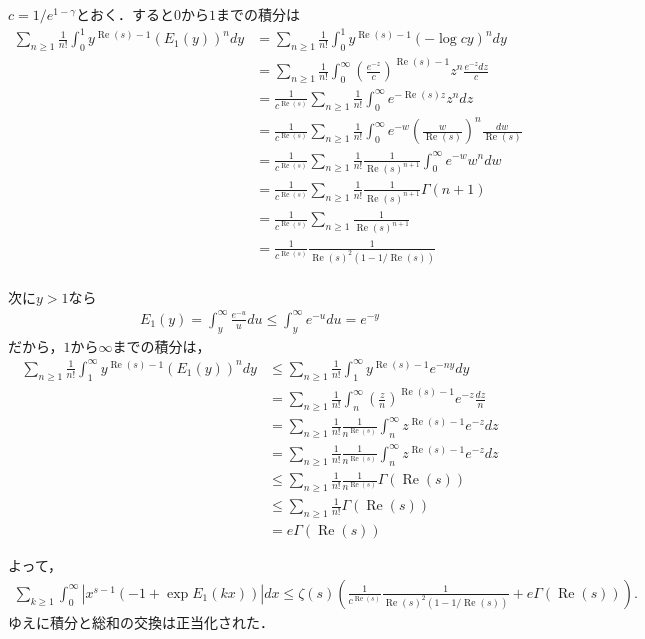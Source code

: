 \documentclass{jsarticle}
\renewcommand\Re{\operatorname{Re}}
\theoremstyle{definition}
\begin{document}
$c = 1/e^{1-\gamma}$とおく．すると$0$から$1$までの積分は
\begin{align*}
\sum_{n \ge 1} \frac{1}{n!} \int_0^1 y^{\Re(s)-1} (E_1(y))^n dy
&= \sum_{n \ge 1} \frac{1}{n!} \int_0^1 y^{\Re(s)-1} (- \log cy)^n dy \\
&= \sum_{n \ge 1} \frac{1}{n!} \int_0^\infty  \left(\frac{e^{-z}}{c}\right)^{\Re(s)-1} z^n \frac{e^{-z}dz}{c} \\
&= \frac{1}{c^{\Re(s)}}\sum_{n \ge 1} \frac{1}{n!} \int_0^\infty  e^{-\Re(s) z} z^n dz \\
&= \frac{1}{c^{\Re(s)}}\sum_{n \ge 1} \frac{1}{n!} \int_0^\infty  e^{-w} \left(\frac{w}{\Re(s)}\right)^n \frac{dw}{\Re(s)} \\
&= \frac{1}{c^{\Re(s)}}\sum_{n \ge 1} \frac{1}{n!} \frac{1}{\Re(s)^{n+1}} \int_0^\infty  e^{-w} w^n dw \\
&= \frac{1}{c^{\Re(s)}}\sum_{n \ge 1} \frac{1}{n!} \frac{1}{\Re(s)^{n+1}} \Gamma(n+1) \\
&= \frac{1}{c^{\Re(s)}}\sum_{n \ge 1} \frac{1}{\Re(s)^{n+1}}  \\
&= \frac{1}{c^{\Re(s)}} \frac{1}{\Re(s)^2 (1-1/\Re(s))}  \\
\end{align*}

次に$y > 1$なら
\begin{align*}
E_1(y) = \int_{y}^\infty \frac{e^{-u}}{u} du \le \int_{y}^\infty e^{-u} du = e^{-y}
\end{align*}
だから，$1$から$\infty$までの積分は，
\begin{align*}
\sum_{n \ge 1} \frac{1}{n!} \int_1^\infty y^{\Re(s)-1} (E_1(y))^n dy
&\le \sum_{n \ge 1} \frac{1}{n!} \int_1^\infty y^{\Re(s)-1} e^{-ny} dy \\
&= \sum_{n \ge 1} \frac{1}{n!} \int_n^\infty \left(\frac{z}{n}\right)^{\Re(s)-1} e^{-z} \frac{dz}{n} \\
&= \sum_{n \ge 1} \frac{1}{n!} \frac{1}{n^{\Re(s)}}\int_n^\infty z^{\Re(s)-1} e^{-z} dz \\
&= \sum_{n \ge 1} \frac{1}{n!} \frac{1}{n^{\Re(s)}}\int_n^\infty z^{\Re(s)-1} e^{-z} dz \\
&\le \sum_{n \ge 1} \frac{1}{n!} \frac{1}{n^{\Re(s)}} \Gamma(\Re(s)) \\
&\le \sum_{n \ge 1} \frac{1}{n!} \Gamma(\Re(s)) \\
&= e \Gamma(\Re(s))
\end{align*}

よって，
\begin{align*}
\sum_{k \ge 1} \int_0^\infty \left|x^{s-1} \left(-1 + \exp E_1(k x) \right)\right| dx
\le \zeta(s) \left(\frac{1}{c^{\Re(s)}} \frac{1}{\Re(s)^2 (1-1/\Re(s))} + e \Gamma(\Re(s))\right).
\end{align*}
ゆえに積分と総和の交換は正当化された．
\end{document}
